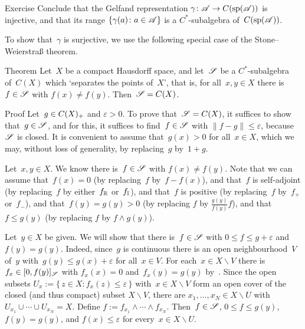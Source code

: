 \documentclass[main]{subfiles}
\begin{document}
\begin{parsec}
\begin{point}{Exercise}
Conclude that the Gelfand representation $\gamma\colon \mathscr{A}\to C(\mathrm{sp}(\mathscr{A}))$
is injective,
and that its range $\{\gamma(a)\colon a\in\mathscr{A}\}$
is a $C^*$-subalgebra of~$C(\mathrm{sp}(\mathscr{A}))$.
\end{point}
\begin{point}%
To show that~$\gamma$ is surjective,
we use the following special case of
the Stone--Weierstra\ss{} theorem. 
\end{point}
\begin{point}{Theorem}%
Let~$X$ be a compact Hausdorff space,
and let~$\mathscr{S}$ be a $C^*$-subalgebra of~$C(X)$
which `separates the points of~$X$',
that is, for all~$x,y\in X$
there is~$f\in \mathscr{S}$ with $f(x)\neq f(y)$.
Then~$\mathscr{S}=C(X)$.
\begin{point}{Proof}%
Let~$g\in C(X)_{+}$ and $\varepsilon >0$.
To prove that~$\mathscr{S}=C(X)$,
it suffices to show that~$g\in \mathscr{S}$,
and for this,
it suffices to find~$f\in \mathscr{S}$ with $\|f-g\|\leq \varepsilon$,
because~$\mathscr{S}$ is closed.
It is convenient to assume that~$g(x)> 0$ for all~$x\in X$,
which we may, without loss of generality,
by replacing~$g$ by~$1+g$.

\begin{point}%
Let~$x,y\in X$.
We know there is~$f\in \mathscr{S}$ with $f(x)\neq f(y)$.
Note that we can assume that~$f(x)=0$ (by replacing~$f$ by~$f-f(x)$),
and that~$f$ is self-adjoint (by replacing~$f$
by either~$f_{\mathbb{R}}$ or~$f_{\mathbb{I}}$),
and that~$f$ is positive
(by replacing~$f$ by~$f_+$ or~$f_-$),
and that~$f(y)=g(y)>0$
(by replacing $f$ by $\frac{g(y)}{f(y)} f$),
and that~$f\leq g(y)$
(by replacing $f$ by $f\wedge g(y)$).
\end{point}
\begin{point}%
Let~$y\in X$ be given.
We will show that there is~$f\in\mathscr{S}$
with $0\leq f\leq g+\varepsilon$
and~$f(y)=g(y)$.
Indeed,
since~$g$ is continuous
there is an open neighbourhood~$V$ of~$y$
with~$g(y) \leq  g(x)+\varepsilon$
for all~$x\in V$.
For each~$x\in X\backslash V$ there is $f_x \in [0,f(y)]_{\mathscr{S}}$
with $f_x(x)=0$ and~$f_x(y)=g(y)$ by~.
Since the open subsets
$U_x := \{\,z\in X\colon f_x(z)\leq \varepsilon\,\}$
with~$x\in X\backslash V$
form an open cover of the closed (and thus compact) subset $X\backslash V$,
there are $x_1,\dotsc,x_N\in X\backslash U$
with $U_{x_1}\cup\dotsb\cup U_{x_N}=X$.
Define $f:=f_{x_1}\wedge \dotsb \wedge f_{x_N}$.
Then~$f\in \mathscr{S}$, $0\leq f\leq g(y)$, $f(y)=g(y)$,
and $f(x)\leq \varepsilon$
for every~$x\in X\backslash U$.


\end{point}
\end{point}
\end{point}
\end{parsec}
\end{document}
